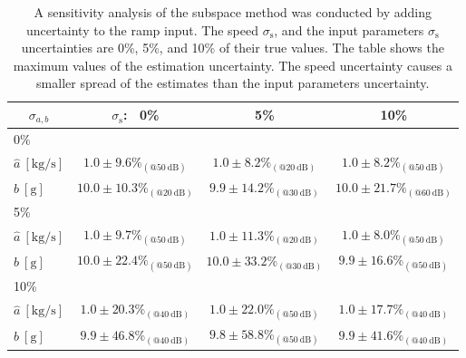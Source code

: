 \begin{table}[h!]
\centering
\caption{ A sensitivity analysis of the subspace method was conducted by adding uncertainty to the ramp input. The speed $\sigma_{\mathrm{s}}$, and the input parameters $\sigma_{\mathrm{s}}$ uncertainties are 0\%, 5\%, and 10\% of their true values. The table shows the maximum values of the estimation uncertainty. The speed uncertainty causes a smaller spread of the estimates than the input parameters uncertainty.}
 
\begin{tabular}{c| c c c} 
\hline  
$\sigma_{{a},{b}}$ & $\sigma_{\mathrm{s}}$: \ 0\% & 5\% & 10\% \\ [0.5ex] 
 \hline
 \multicolumn{1}{l|}{0\%} \\
 \multicolumn{1}{l|}{\hspace{2mm} $\widehat{a} \ \mathrm{[kg/s]}$} & $1.0 \pm 9.6 \%_{(@50 \ \mathrm{dB})}$ &  $1.0 \pm 8.2 \%_{(@20 \ \mathrm{dB})}$ & $1.0 \pm 8.2 \%_{(@50 \ \mathrm{dB})}$ \\ 
 \multicolumn{1}{l|}{\hspace{2mm} $\widehat{b} \ \mathrm{[g]}$} & $10.0 \pm 10.3 \%_{(@20 \ \mathrm{dB})}$ & $9.9 \pm 14.2 \%_{(@30 \ \mathrm{dB})}$ & $10.0 \pm 21.7 \%_{(@60 \ \mathrm{dB})}$ \\ 
 \multicolumn{1}{l|}{5\%} \\
 \multicolumn{1}{l|}{\hspace{2mm} $\widehat{a} \ \mathrm{[kg/s]}$} & $1.0 \pm 9.7 \%_{(@50 \ \mathrm{dB})}$ & $1.0 \pm 11.3 \%_{(@20 \ \mathrm{dB})}$ & $1.0 \pm 8.0 \%_{(@50 \ \mathrm{dB})}$ \\  
 \multicolumn{1}{l|}{\hspace{2mm} $\widehat{b} \ \mathrm{[g]}$} & $10.0 \pm 22.4 \%_{(@50 \ \mathrm{dB})}$ & $10.0 \pm 33.2 \%_{(@30 \ \mathrm{dB})}$ & $9.9 \pm 16.6 \%_{(@50 \ \mathrm{dB})}$ \\ 
\multicolumn{1}{l|}{10\%} \\
\multicolumn{1}{l|}{\hspace{2mm} $\widehat{a} \ \mathrm{[kg/s]}$} & $1.0 \pm 20.3 \%_{(@40 \ \mathrm{dB})}$ & $1.0 \pm 22.0 \%_{(@50 \ \mathrm{dB})}$ & $1.0 \pm 17.7 \%_{(@40 \ \mathrm{dB})}$ \\    
 \multicolumn{1}{l|}{\hspace{2mm} $\widehat{b} \ \mathrm{[g]}$} & $9.9 \pm 46.8 \%_{(@40 \ \mathrm{dB})}$ & $9.8 \pm 58.8 \%_{(@50 \ \mathrm{dB})}$ & $9.9 \pm 41.6 \%_{(@40 \ \mathrm{dB})}$ \\ [0.5ex] 
\hline
\end{tabular}
\label{table:dd_sensitivity}
\end{table}


